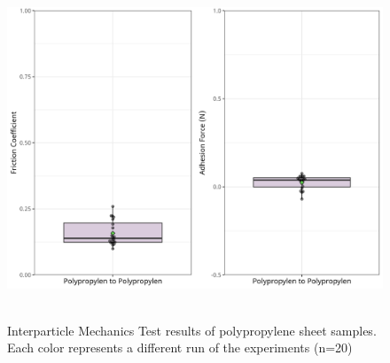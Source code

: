 \documentclass[xcolor=dvipsnames,10pt,hidelinks]{article}
\begin{document}
\begin{figure}[htbp]
\centering
\includegraphics[height=4in]{./figures/pp_pp_comb_ipm_coeffs_box_plts.png}
\caption{\label{fig:orgc30abe6}Interparticle Mechanics Test results of polypropylene sheet samples. Each color represents a different run of the experiments (n=20)}
\end{figure}

\newpage
\end{document}

